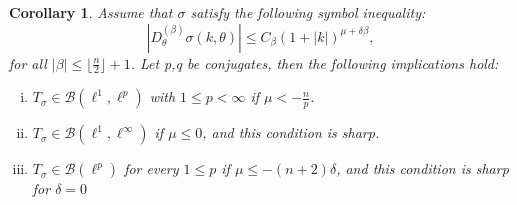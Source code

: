 \documentclass[pdflatex,sn-mathphys-num]{sn-jnl}%
\theoremstyle{thmstyleone}%
\newtheorem{corollary}{Corollary}
\theoremstyle{thmstyletwo}%
\theoremstyle{thmstylethree}%
\begin{document}
\begin{corollary}\label{Theorem bounded symbols}
    Assume that $\sigma$ satisfy the following symbol inequality:
    \[|D_\theta^{(\beta)}\sigma(k,\theta)|\leq C_{\beta} (1+|k|)^{\mu+\delta\beta }, \]
    for all $|\beta|\leq \lfloor \frac{n}{2} \rfloor +1$. Let
     p,q be conjugates, then the following implications hold:
    \begin{enumerate}[(i)]
        \item $T_\sigma\in\mathcal{B}(\ell^1,\ell^p)$ with $1\leq p<\infty$ if $\mu<-\frac{n}{p}$.\label{bounded symbol i}
        \item $T_\sigma\in\mathcal{B}(\ell^1,\ell^\infty)$ if $\mu\leq 0$, and this condition is sharp.\label{bounded symbol ii}
        \item $T_\sigma\in\mathcal{B}(\ell^p)$  for every $1\leq p$ if $\mu\leq-(n+2)\delta$, and this condition is sharp for $\delta=0$ \label{bounded symbol iii} 
     \end{enumerate}

\end{corollary}
\end{document}
